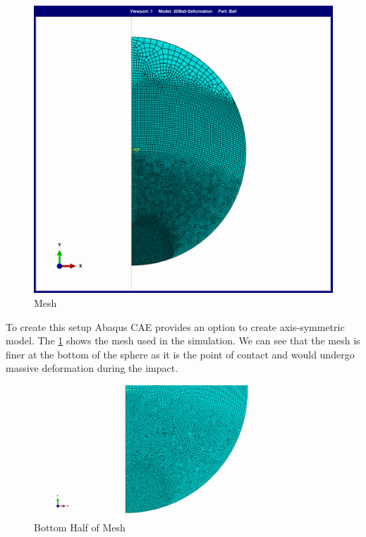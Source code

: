 \begin{figure}[H]
    \centering
	\includegraphics[scale=0.075]{../images/Mesh/Mesh.png}
	\caption{Mesh}
	\label{fig:mesh}
\end{figure}

To create this setup Abaqus CAE provides an option to create axis-symmetric model. The \ref{fig:mesh} shows the mesh used in the simulation. We can see that the mesh is finer at the bottom of the sphere as it is the point of contact and would undergo massive deformation during the impact. 


\begin{figure}[H]
    \centering
	\includegraphics[scale=0.075]{../images/Mesh/Mesh_Bottom_Half_lowRes.png}
	\caption{Bottom Half of Mesh}
	\label{fig:mesh_bottom_half}
\end{figure}

